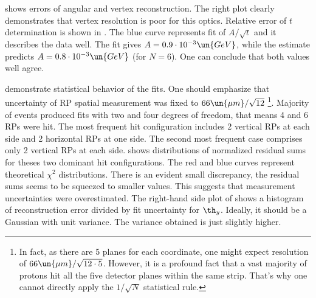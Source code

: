 

 shows errors of angular and vertex reconstruction. The right plot clearly demonstrates that vertex resolution is poor for this optics. Relative error of $t$ determination is shown in . The blue curve represents fit of $A/\sqrt{t}$ and it describes the data well. The fit gives $A = 0.9\cdot10^{-3}\un{GeV}$, while the estimate  predicts $A = 0.8\cdot10^{-3}\un{GeV}$ (for $N=6$). One can conclude that both values well agree.

 demonstrate statistical behavior of the fits. One should emphasize that uncertainty of RP spatial measurement was fixed to $66\un{\mu m}/\sqrt{12}$ \footnote{
In fact, as there are 5 planes for each coordinate, one might expect resolution of $66\un{\mu m}/\sqrt{12\cdot 5}$. However, it is a profound fact that a vast majority of protons hit all the five detector planes within the same strip. That's why one cannot directly apply the $1/\sqrt{N}$ statistical rule.}.
Majority of events produced fits with two and four degrees of freedom, that means 4 and 6 RPs were hit. The most frequent hit configuration includes 2 vertical RPs at each side and 2 horizontal RPs at one side. The second most frequent case comprises only 2 vertical RPs at each side.  shows distributions of normalized residual sums for theses two dominant hit configurations. The red and blue curves represent theoretical $\chi^2$ distributions. There is an evident small discrepancy, the residual sums seems to be squeezed to smaller values. This suggests that measurement uncertainties were overestimated. The right-hand side plot of  shows a histogram of reconstruction error divided by fit uncertainty for $\th_y$. Ideally, it should be a Gaussian with unit variance. The variance obtained is just slightly higher.

